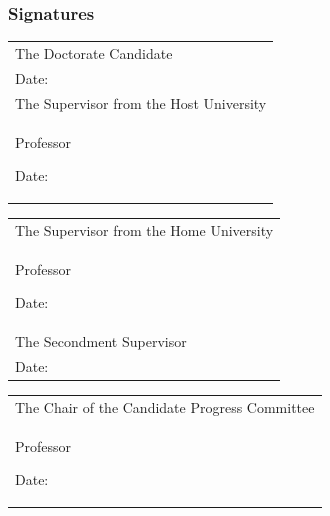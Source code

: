\documentclass[12pt]{article}
\newcommand{\dottedline}{%
   {\rule{0pt}{5mm}\dotfill\newline}}
\begin{document}
\vspace*{3mm}
\subsubsection*{Signatures}
\vspace*{3mm}

\begin{tabular}{p{}}
The Doctorate Candidate\\
\dottedline
\vspace{2cm}%
Date: \\

The Supervisor from the Host University\\
Professor \dottedline
\vspace{2cm}%
Date: \\

\end{tabular}
%
\begin{tabular}{p{}}
The Supervisor from the Home University\\
Professor \dottedline
\vspace{2cm}%
Date: \\

The Secondment Supervisor \\
\dottedline
\vspace{2cm}%
Date: \\

\end{tabular}


\begin{center}
\begin{tabular}{p{}}
The Chair of the Candidate Progress Committee\\
Professor \dottedline
\vspace{2cm}%
Date: \\

\end{tabular}
\end{center}
\end{document}

